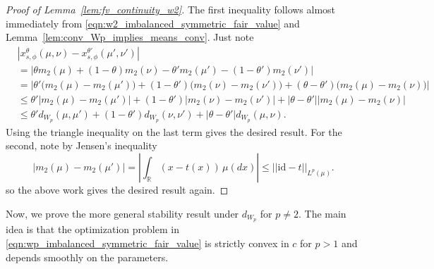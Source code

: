 \documentclass[11pt]{article}
\theoremstyle{plain}
\theoremstyle{definition}
\numberwithin{equation}{section}
\newcommand{\R}{\mathbb{R}}
\begin{document}
\begin{proof}[Proof of Lemma~\ref{lem:fv_continuity_w2}]
    The first inequality follows almost immediately from \eqref{eqn:w2_imbalanced_symmetric_fair_value}
    and Lemma~\ref{lem:conv_Wp_implies_means_conv}. Just note
    \begin{align*}
        &\left|x_{s,\phi}^\theta(\mu, \nu) - x_{s,\phi}^{\theta'}(\mu', \nu')\right|\\
        &=
        \left|
        \theta m_2(\mu) + (1-\theta)m_2(\nu)
        - \theta' m_2(\mu') - (1-\theta')m_2(\nu')
        \right| \\[5pt]
        &=
        \left|
        \theta' \bigl(m_2(\mu)-m_2(\mu')\bigr)
        + (1-\theta')\bigl(m_2(\nu)-m_2(\nu')\bigr)
        + (\theta-\theta')\bigl(m_2(\mu)-m_2(\nu)\bigr)
        \right| \\[5pt]
        &\leq
        \theta' \left|m_2(\mu)-m_2(\mu')\right|
        + (1-\theta') \left|m_2(\nu)-m_2(\nu')\right|
        + |\theta-\theta'| \left|m_2(\mu)-m_2(\nu)\right| \\[5pt]
        &\leq
        \theta' d_{W_p}(\mu,\mu')
        + (1-\theta') d_{W_p}(\nu,\nu')
        + |\theta-\theta'| d_{W_p}(\mu,\nu).
    \end{align*}
    Using the triangle inequality on the last term gives the desired result. For the second, note by Jensen's inequality
    \[|m_2(\mu)-m_2(\mu')| = \left|\int_\R (x-t(x))\,\mu(dx)\right| \leq ||\mathrm{id}-t||_{L^p(\mu)}.\]
    \noindent so the above work gives the desired result again.
\end{proof}

\noindent Now, we prove the more general stability result under $d_{W_p}$ for $p \neq 2$.
The main idea is that the optimization problem in \eqref{eqn:wp_imbalanced_symmetric_fair_value} is strictly convex in $c$ for $p > 1$ and depends smoothly on the parameters.
\end{document}
